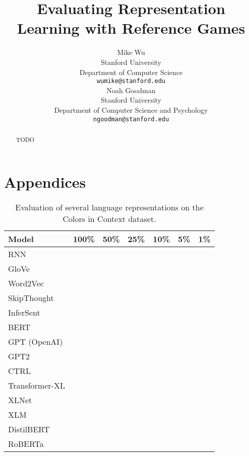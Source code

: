 \documentclass[11pt,a4paper]{article}
\title{Evaluating Representation Learning with Reference Games}
\author{Mike Wu \\
  Stanford University \\
  Department of Computer Science \\
  \texttt{wumike@stanford.edu} \\ \And
  Noah Goodman \\
  Stanford University \\
  Department of Computer Science and Psychology \\
  \texttt{ngoodman@stanford.edu} \\}
\date{}
\begin{document}
\maketitle
\begin{abstract}
TODO
\end{abstract}




\appendix

\section{Appendices}
\label{sec:appendix}

\begin{table*}[t!]
\centering
\begin{tabular}{lcccccc}
\hline
\textbf{Model} & \textbf{100\%} & \textbf{50\%} & \textbf{25\%} & \textbf{10\%} & \textbf{5\%} & \textbf{1\%} \\
\hline
RNN & & & & & & \\
GloVe & & & & & & \\
Word2Vec & & & & & & \\
SkipThought & & & & & & \\
InferSent & & & & & & \\
BERT & & & & & & \\
GPT (OpenAI) & & & & & & \\
GPT2 & & & & & & \\
CTRL & & & & & & \\
Transformer-XL & & & & & & \\
XLNet & & & & & & \\
XLM & & & & & & \\
DistilBERT & & & & & & \\
RoBERTa & & & & & & \\
\hline
\end{tabular}
\caption{\label{table:colors} Evaluation of several language representations on the Colors in Context dataset.}
\end{table*}
\end{document}
